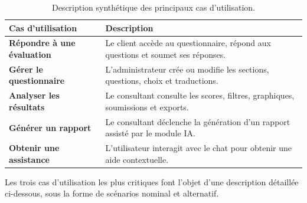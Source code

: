 \documentclass[12pt,a4paper]{report}
\begin{document}
\begin{table}[H]
\centering
\caption{Description synthétique des principaux cas d'utilisation.}
\begin{tabularx}{\textwidth}{>{\bfseries}L{4cm}Y}
\toprule
Cas d'utilisation & Description \\
\midrule
Répondre à une évaluation & Le client accède au questionnaire, répond aux questions et soumet ses réponses. \\
Gérer le questionnaire & L'administrateur crée ou modifie les sections, questions, choix et traductions. \\
Analyser les résultats & Le consultant consulte les scores, filtres, graphiques, soumissions et exports. \\
Générer un rapport & Le consultant déclenche la génération d'un rapport assisté par le module IA. \\
Obtenir une assistance & L'utilisateur interagit avec le chat pour obtenir une aide contextuelle. \\
\bottomrule
\end{tabularx}
\end{table}

Les trois cas d'utilisation les plus critiques font l'objet d'une description détaillée ci-dessous, sous la forme de scénarios nominal et alternatif.
\end{document}
